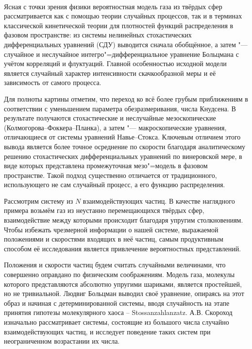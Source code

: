 \
\vzmscaption

Ясная с точки зрения физики вероятностная модель газа из твёрдых сфер рассматривается как с помощью теории случайных процессов, так и в терминах классической кинетической теории для плотностей функций распределения в фазовом пространстве: из системы нелинейных стохастических дифференциальных уравнений (СДУ) выводится сначала обобщённое, а затем "--- случайное и неслучайное интегро"=дифференциальное уравнение Больцмана с учётом корреляций и флуктуаций. Главной особенностью исходной модели является случайный характер интенсивности скачкообразной меры и её зависимость от самого процесса.

Для полноты картины отметим, что переход ко всё более грубым приближениям в соответствии с уменьшением параметра обезразмеривания, числа Кнудсена. В результате получаются стохастические и неслучайные мезоскопические (Колмогорова--Фоккера--Планка), а затем "--- макроскопические уравнения, отличающиеся от системы уравнений Навье--Стокса. Ключевым отличием этого вывода является более точное осреднение по скорости благодаря аналитическому решению стохастических дифференциальных уравнений по винеровской мере, в виде которых представлена промежуточная мезо"=модель в фазовом пространстве. Такой подход существенно отличается от традиционного, использующего не сам случайный процесс, а его функцию распределения.

Рассмотрим систему из $N$ взаимодействующих частиц. В качестве наглядного примера возьмём газ из неустанно перемещающихся твёрдых сфер, взаимодействие между которыми происходит благодаря упругим столкновениям. Чтобы избежать чрезмерной информации о нашей системе, выражаемой положениями и скоростями входящих в неё частиц, самым продуктивным способом её исследования является привлечение вероятностных представлений.


Положения и скорости частиц будем считать случайными величинами, что совершенно оправдано по физическим соображениям.
Модель газа, молекулы которого представляются абсолютно упругими шариками, является простейшей, но не
тривиальной. Людвиг Больцман выводил своё
уравнение, опираясь на этот образ и начиная с детерминированной системы, вводя случайность на этапе принятия гипотезы молекулярного хаоса – \foreignlanguage{ngerman}{Stossanzahlanzatz}.
А.В. Скороход изначально рассматривает системы, состоящие из большого числа случайно взаимодействующих
частиц, и исследует поведение таких систем при неограниченном возрастании их числа.

